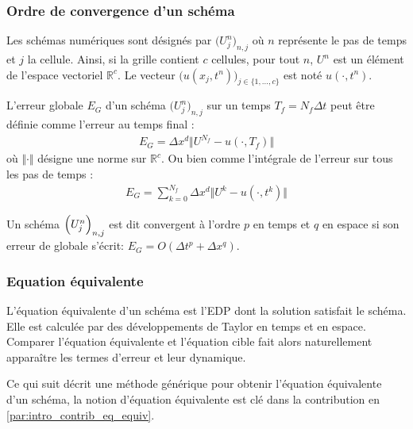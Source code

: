         \subsubsection{Ordre de convergence d'un schéma}
        Les schémas numériques sont désignés par $\bigl(U^n_j\bigr)_{n,j}$ où $n$ représente le pas de temps 
        et $j$ la cellule. Ainsi, si la grille contient $c$ cellules, 
        pour tout $n$, $U^n$ est un élément de l'espace vectoriel $\mathbb{R}^c$.
        Le vecteur $\bigl(u(x_j,t^n)\bigr)_{j \in \{1,\ldots,c\}}$ est noté $u(\cdot,t^n)$.

        \begin{definition}
        L'erreur globale $E_G$ d'un schéma $\bigl(U^n_j\bigr)_{n,j}$ sur un temps $T_f = N_f \Delta t$ peut être définie comme l'erreur au temps final :
        \begin{align}
        E_G = \Delta x^d \Vert U^{N_f} - u(\cdot , T_f) \Vert
        \end{align}
        où $\Vert \cdot \Vert$ désigne une norme sur $\mathbb{R}^c$.
        Ou bien comme l'intégrale de l'erreur sur tous les pas de temps :
        \begin{align}
        E_G = \sum_{k=0}^{N_f}\Delta x^d \Vert U^{k} - u(\cdot , t^k) \Vert
        \end{align}
        \end{definition}
        \begin{definition}
            Un schéma $\Bigl(U^n_j\Bigr)_{n,j}$ est dit convergent à l'ordre $p$ en temps et $q$ en espace si 
            son erreur de globale s'écrit: $E_G = O(\Delta t^{p} + \Delta x^{q})$.
        \end{definition}
        \subsubsection{Equation équivalente}\label{par:eq_equiv}
        \begin{definition}
        L'équation équivalente d'un schéma est l'EDP dont la solution satisfait le schéma.
        Elle est calculée par des développements de Taylor en temps et en espace.
        Comparer l'équation équivalente et l'équation cible fait alors naturellement apparaître les termes d'erreur et leur dynamique.
        \end{definition}

        Ce qui suit décrit une méthode générique pour obtenir l'équation équivalente d'un schéma, la notion d'équation équivalente est clé dans la contribution en \ref{par:intro_contrib_eq_equiv}.

